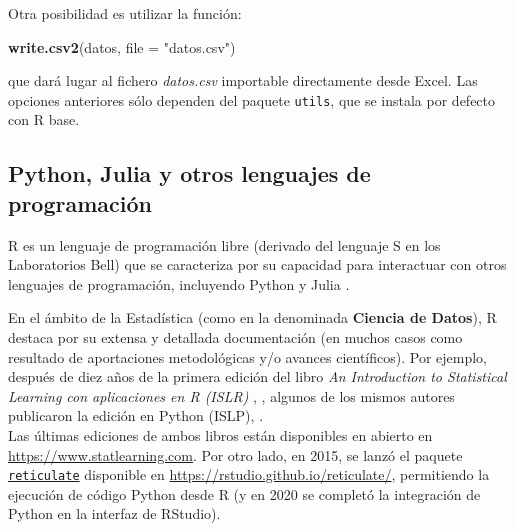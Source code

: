 \documentclass[
]{book}
\newenvironment{Shaded}{\begin{snugshade}}{\end{snugshade}}
\newcommand{\AttributeTok}[1]{\textcolor[rgb]{0.13,0.29,0.53}{#1}}
\newcommand{\FunctionTok}[1]{\textcolor[rgb]{0.13,0.29,0.53}{\textbf{#1}}}
\newcommand{\NormalTok}[1]{#1}
\newcommand{\OtherTok}[1]{\textcolor[rgb]{0.56,0.35,0.01}{#1}}
\newcommand{\SpecialCharTok}[1]{\textcolor[rgb]{0.81,0.36,0.00}{\textbf{#1}}}
\newcommand{\StringTok}[1]{\textcolor[rgb]{0.31,0.60,0.02}{#1}}
\theoremstyle{break}
\theoremstyle{nonumberplain}
\begin{document}
Otra posibilidad es utilizar la función:

\begin{Shaded}
\begin{Highlighting}[]
\FunctionTok{write.csv2}\NormalTok{(datos, }\AttributeTok{file =} \StringTok{"datos.csv"}\NormalTok{)}
\end{Highlighting}
\end{Shaded}

que dará lugar al fichero \emph{datos.csv} importable directamente desde Excel. Las opciones anteriores sólo dependen del paquete \texttt{utils}, que se instala por defecto con R base.

\subsection{Python, Julia y otros lenguajes de programación}\label{python-julia-y-otros-lenguajes-de-programaciuxf3n}

R es un lenguaje de programación libre (derivado del lenguaje S en los Laboratorios Bell) que se caracteriza por su capacidad para interactuar con otros lenguajes de programación, incluyendo Python \citep{python} y Julia \citep{julia}.

En el ámbito de la Estadística (como en la denominada \textbf{Ciencia de Datos}), R destaca por su extensa y detallada documentación (en muchos casos como resultado de aportaciones metodológicas y/o avances científicos). Por ejemplo, después de diez años de la primera edición del libro \emph{An Introduction to Statistical Learning con aplicaciones en R (ISLR)} , \citet{james2013introduction}, algunos de los mismos autores publicaron la edición en Python (ISLP), \citet{james2023introduction}.\\
Las últimas ediciones de ambos libros están disponibles en abierto en \href{https://www.statlearning.com/}{https://www.statlearning.com}.
Por otro lado, en 2015, se lanzó el paquete \href{https://rstudio.github.io/reticulate/}{\texttt{reticulate}} disponible en \url{https://rstudio.github.io/reticulate/}, permitiendo la ejecución de código Python desde R (y en 2020 se completó la integración de Python en la interfaz de RStudio).

\begin{Shaded}
\end{Shaded}
\end{document}
